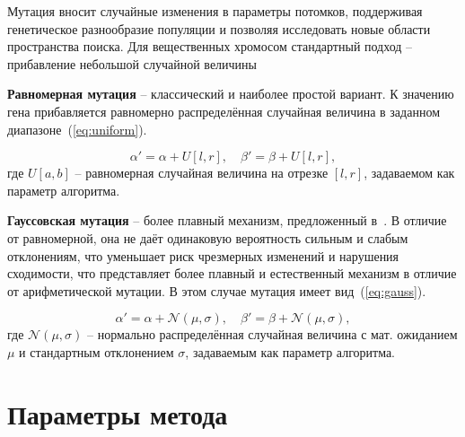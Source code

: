 Мутация вносит случайные изменения в параметры потомков, поддерживая генетическое разнообразие популяции и позволяя исследовать новые области пространства поиска. Для вещественных хромосом стандартный подход -- прибавление небольшой случайной величины~\cite{genetic-engineer}

\textbf{Равномерная мутация} -- классический и наиболее простой вариант. К значению гена прибавляется равномерно распределённая случайная величина в заданном диапазоне~(\ref{eq:uniform}).

\begin{equation}
\alpha' = \alpha + U[l,r], \quad \beta' = \beta + U[l,r],
\label{eq:uniform}
\end{equation}
где $U[a,b]$ -- равномерная случайная величина на отрезке $[l, r]$, задаваемом как параметр алгоритма.

\textbf{Гауссовская мутация} -- более плавный механизм, предложенный в~\cite{hetero}. В отличие от равномерной, она не даёт одинаковую вероятность сильным и слабым отклонениям, что уменьшает риск чрезмерных изменений и нарушения сходимости, что представляет более плавный и естественный механизм в отличие от арифметической мутации. В этом случае мутация имеет вид~(\ref{eq:gauss}).

\begin{equation}
\alpha' = \alpha + \mathcal{N}(\mu, \sigma), \quad \beta' = \beta + \mathcal{N}(\mu, \sigma),
\label{eq:gauss}
\end{equation}
где \(\mathcal{N}(\mu, \sigma)\) -- нормально распределённая случайная величина с мат. ожиданием $\mu$ и стандартным отклонением \(\sigma\), задаваемым как параметр алгоритма.

\section{Параметры метода}

